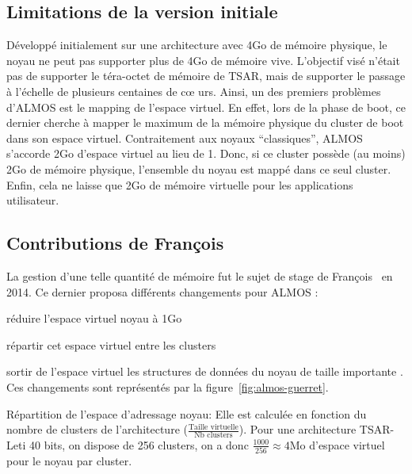     \subsection{Limitations de la version initiale}

      Développé initialement sur une architecture avec 4Go de mémoire physique,
      le noyau ne peut pas supporter plus de 4Go de mémoire vive. L'objectif
      visé n'était pas de supporter le téra-octet de mémoire de TSAR, mais de
      supporter le passage à l'échelle de plusieurs centaines de c\oe
      urs. Ainsi, un des premiers problèmes d'ALMOS est le mapping de l'espace
      virtuel. En effet, lors de la phase de boot, ce dernier cherche à mapper
      le maximum de la mémoire physique du cluster de boot dans son espace
      virtuel. Contraitement aux noyaux ``classiques'', ALMOS s'accorde 2Go
      d'espace virtuel au lieu de 1. Donc, si ce cluster possède (au moins) 2Go
      de mémoire physique, l'ensemble du noyau est mappé dans ce seul
      cluster. Enfin, cela ne laisse que 2Go de mémoire virtuelle pour les
      applications utilisateur.


    \subsection{Contributions de François \citeauthor{guerret2014exploitation}}

      La gestion d'une telle quantité de mémoire fut le sujet de stage de
      François~\citet{guerret2014exploitation} en 2014. Ce dernier proposa
      différents changements pour ALMOS : \benumline \item réduire l'espace
      virtuel noyau à 1Go \item répartir cet espace virtuel entre les
      clusters \item sortir de l'espace virtuel les structures de données du
      noyau de taille importante \eenumline. Ces changements sont représentés
      par la figure~\ref{fig:almos-guerret}.

      \begin{paragraph}{Répartition de l'espace d'adressage noyau:}
        Elle est calculée en fonction du nombre de clusters de l'architecture
        ($\frac{\text{Taille virtuelle}}{\text{Nb clusters}}$). Pour une
        architecture TSAR-Leti 40 bits, on dispose de 256 clusters, on a donc
        $\frac{1000}{256}\approx4$Mo d'espace virtuel pour le noyau par cluster.
      \end{paragraph}

